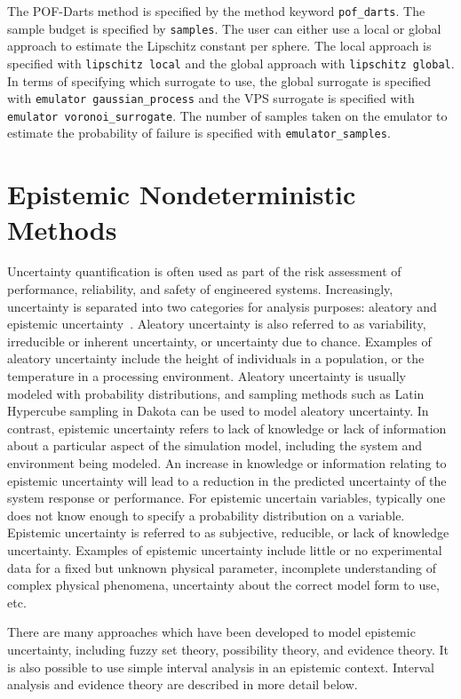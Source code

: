 The POF-Darts method is specified by the method keyword 
\texttt{pof\_darts}. The sample budget is specified by \texttt{samples}.
The user can either use a local or global approach to estimate the Lipschitz constant per sphere. 
The local approach is specified with \texttt{lipschitz local} and the global approach with \texttt{lipschitz global}. 
In terms of specifying which surrogate to use, the global surrogate is specified with \texttt{emulator gaussian\_process}
and the VPS surrogate is specified with \texttt{emulator voronoi\_surrogate}. 
The number of samples taken on the emulator to estimate the probability of failure is specified with \texttt{emulator\_samples}.

\section{Epistemic Nondeterministic Methods}\label{uq:epistemic}

Uncertainty quantification is often used as part of the risk
assessment of performance, reliability, and safety of engineered
systems. Increasingly, uncertainty is separated into two categories
for analysis purposes: aleatory and epistemic
uncertainty~\cite{Obe03,Hel07}. Aleatory uncertainty is also referred to as
variability, irreducible or inherent uncertainty, or uncertainty due
to chance. Examples of aleatory uncertainty include the height of
individuals in a population, or the temperature in a processing
environment. Aleatory uncertainty is usually modeled with probability
distributions, and sampling methods such as Latin Hypercube sampling
in Dakota can be used to model aleatory uncertainty. In contrast,
epistemic uncertainty refers to lack of knowledge or lack of
information about a particular aspect of the simulation model,
including the system and environment being modeled. An increase in
knowledge or information relating to epistemic uncertainty will lead
to a reduction in the predicted uncertainty of the system response or
performance. For epistemic uncertain variables, typically one does not
know enough to specify a probability distribution on a variable.
Epistemic uncertainty is referred to as subjective, reducible, or lack
of knowledge uncertainty. Examples of epistemic uncertainty include
little or no experimental data for a fixed but unknown physical
parameter, incomplete understanding of complex physical phenomena,
uncertainty about the correct model form to use, etc.

There are many approaches which have been developed to model epistemic
uncertainty, including fuzzy set theory, possibility theory, and
evidence theory. It is also possible to use simple interval analysis in 
an epistemic context. Interval analysis and evidence theory are 
described in more detail below.

